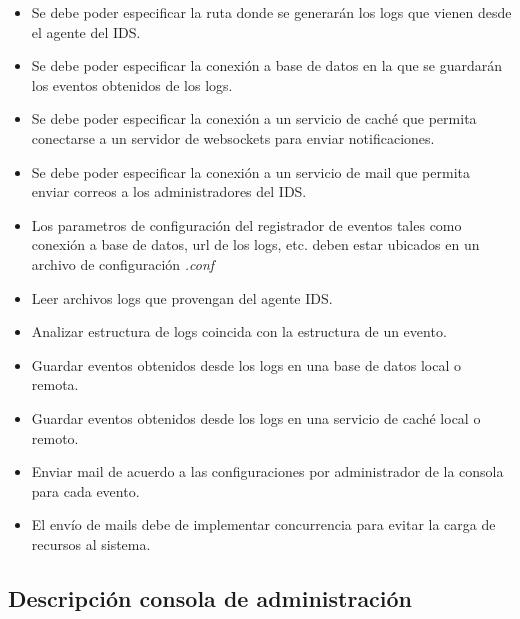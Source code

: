 
\begin{itemize}
    \item Se debe poder especificar la ruta donde se generarán los logs que vienen desde el agente del IDS.
    \item Se debe poder especificar la conexión a base de datos en la que se guardarán los eventos obtenidos de los logs.
    \item Se debe poder especificar la conexión a un servicio de caché que permita conectarse a un servidor de websockets para enviar notificaciones.
    \item Se debe poder especificar la conexión a un servicio de mail que permita enviar correos a los administradores del IDS.
    \item Los parametros de configuración del registrador de eventos tales como conexión a base de datos, url de los logs, etc. deben estar ubicados en un archivo de configuración \textit{.conf}
    \item Leer archivos logs que provengan del agente IDS.
    \item Analizar estructura de logs coincida con la estructura de un evento.
    \item Guardar eventos obtenidos desde los logs en una base de datos local o remota.
    \item Guardar eventos obtenidos desde los logs en una servicio de caché local o remoto.
    \item Enviar mail de acuerdo a las configuraciones por administrador de la consola para cada evento.
    \item El envío de mails debe de implementar concurrencia para evitar la carga de recursos al sistema.
\end{itemize}


%

\subsection{Descripción consola de administración}


